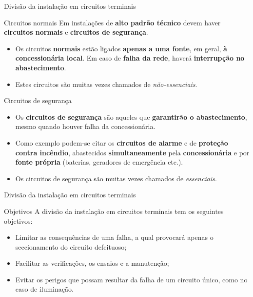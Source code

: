 \begin{frame}{Divisão da instalação em circuitos terminais}
	\begin{block}{Circuitos normais}
		Em instalações de \textbf{alto padrão técnico }devem haver \textbf{circuitos normais }e \textbf{circuitos de segurança}.
		\begin{itemize}
			\item Os circuitos \textbf{normais }estão ligados \textbf{apenas a uma fonte}, em geral, \textbf{à concessionária local}.
			      Em caso de \textbf{falha da rede}, haverá \textbf{interrupção no abastecimento}.
			\item Estes circuitos são muitas vezes chamados de \textit{não-essenciais}.
		\end{itemize}
	\end{block}
	\vspace{-0.1cm}
	\begin{block}{Circuitos de segurança}
		\begin{itemize}
			\item Os \textbf{circuitos de segurança }são aqueles que \textbf{garantirão o abastecimento}, mesmo quando houver falha da concessionária.
			\item Como exemplo podem-se citar os \textbf{circuitos de alarme }e de \textbf{proteção contra incêndio}, abastecidos \textbf{simultaneamente }pela \textbf{concessionária }e por \textbf{fonte própria }(baterias, geradores de emergência etc.).
			\item Os circuitos de segurança são muitas vezes chamados de \textit{essenciais}.
		\end{itemize}
	\end{block}
\end{frame}


\begin{frame}{Divisão da instalação em circuitos terminais}
	\begin{block}{Objetivos}
		A divisão da instalação em circuitos terminais tem os seguintes objetivos:
		\begin{itemize}
			\item Limitar as consequências de uma falha, a qual provocará apenas o seccionamento do circuito defeituoso;
			\item Facilitar as verificações, os ensaios e a manutenção;
			\item Evitar os perigos que possam resultar da falha de um circuito único, como no caso de iluminação.
		\end{itemize}
	\end{block}
\end{frame}


